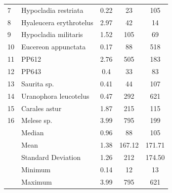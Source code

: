 \documentclass[12pt,a4paper,pdftex]{article}
\begin{document}
\begin{table}[p]
\begin{tabular}{llccc}
	7  & Hypocladia restriata           & 0.22                                                         & 23                                                 & 105                                                             \\
	8  & Hyaleucera erythrotelus        & 2.97                                                         & 42                                                 & 14                                                              \\
	9  & Hypocladia militaris           & 1.52                                                         & 105                                                & 69                                                              \\
	10 & Eucereon appunctata            & 0.17                                                         & 88                                                 & 518                                                             \\
	11 & PP612                          & 2.76                                                         & 505                                                & 183                                                             \\
	12 & PP643                          & 0.4                                                          & 33                                                 & 83                                                              \\
	13 & Saurita sp.                    & 0.41                                                         & 44                                                 & 107                                                             \\
	14 & Uranophora leucotelus          & 0.47                                                         & 292                                                & 621                                                             \\
	15 & Carales astur                  & 1.87                                                         & 215                                                & 115                                                             \\
	16 & Melese sp.                     & 3.99                                                         & 795                                                & 
	199           \\ \hline
	& Median & 0.96	& 88	& 105 \\
	& Mean & 1.38	& 167.12 &	171.71 \\
	& Standard Deviation & 1.26	& 212 &	174.50 \\
	& Minimum & 0.14	& 12	& 13 \\
	& Maximum & 3.99 &	795	& 621
	
	
	                                                
\end{tabular}
\end{table}
\FloatBarrier
\end{document}
